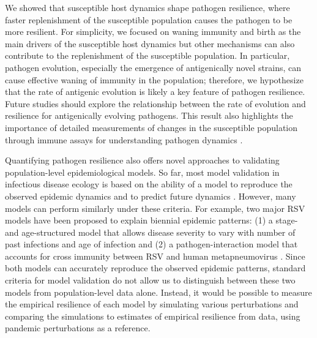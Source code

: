 \documentclass[12pt]{article}
\begin{document}
We showed that susceptible host dynamics shape pathogen resilience, where faster replenishment of the susceptible population causes the pathogen to be more resilient.
For simplicity, we focused on waning immunity and birth as the main drivers of the susceptible host dynamics but other mechanisms can also contribute to the replenishment of the susceptible population.
In particular, pathogen evolution, especially the emergence of antigenically novel strains, can cause effective waning of immunity in the population;
therefore, we hypothesize that the rate of antigenic evolution is likely a key feature of pathogen resilience.
Future studies should explore the relationship between the rate of evolution and resilience for antigenically evolving pathogens.
This result also highlights the importance of detailed measurements of changes in the susceptible population through immune assays for understanding pathogen dynamics \citep{nguyen2022enterovirus}.

Quantifying pathogen resilience also offers novel approaches to validating population-level epidemiological models.
So far, most model validation in infectious disease ecology is based on the ability of a model to reproduce the observed epidemic dynamics and to predict future dynamics \citep{grenfell2002dynamics,bhattacharyya2015cross,pitzer2015environmental,dean2018human,pons2018serotype}.
However, many models can perform similarly under these criteria.
For example, two major RSV models have been proposed to explain biennial epidemic patterns: (1) a stage- and age-structured model that allows disease severity to vary with number of past infections and age of infection \citep{pitzer2015environmental} and (2) a pathogen-interaction model that accounts for cross immunity between RSV and human metapneumovirus \citep{bhattacharyya2015cross}.
Since both models can accurately reproduce the observed epidemic patterns, standard criteria for model validation do not allow us to distinguish between these two models from population-level data alone.
Instead, it would be possible to measure the empirical resilience of each model by simulating various perturbations and comparing the simulations to estimates of empirical resilience from data, using pandemic perturbations as a reference.
\end{document}
